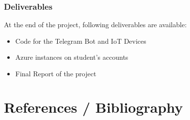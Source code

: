 \documentclass[a4paper]{article}
\begin{document}
			\subsubsection{Deliverables}
			
			At the end of the project, following deliverables are available:
			\begin{itemize}
				\item Code for the Telegram Bot and IoT Devices
				\item Azure instances on student's accounts
				\item Final Report of the project
			\end{itemize}
						
	
	\newpage
	\section{References / Bibliography}
	
\end{document}
